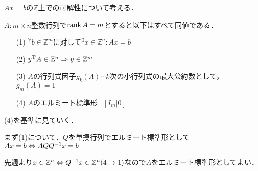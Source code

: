 $Ax=b$の$\mathbb{Z}$上での可解性について考える．
\begin{thm}
  $A:m\times n$整数行列で$\rank{A}=m$とすると以下はすべて同値である．
\end{thm}
\begin{itemize}
  \item[(1)]${}^{\forall}b\in{\mathbb{Z}}^m$に対して${}^{\exists}x\in{\mathbb{Z}}^n :Ax=b$\\
  \item[(2)]${y}^{\mathrm{T}}A\in{\mathbb{Z}}^n \Rightarrow y\in{\mathbb{Z}}^m$\\
  \item[(3)]$A$の行列式因子$g_k (A)\cdots k$次の小行列式の最大公約数として，$g_m (A)=1$\\
  \item[(4)]$A$のエルミート標準形=$[I_m |0]$
\end{itemize}

(4)を基準に見ていく．

まず(1)について．$Q$を単摸行列でエルミート標準形として$Ax=b\Leftrightarrow AQ{Q}^{-1}x=b$

先週より$x\in{\mathbb{Z}}^n \Leftrightarrow{Q}^{-1}x\in{\mathbb{Z}}^n (4\to 1)$なので$A$をエルミート標準形としてよい．

